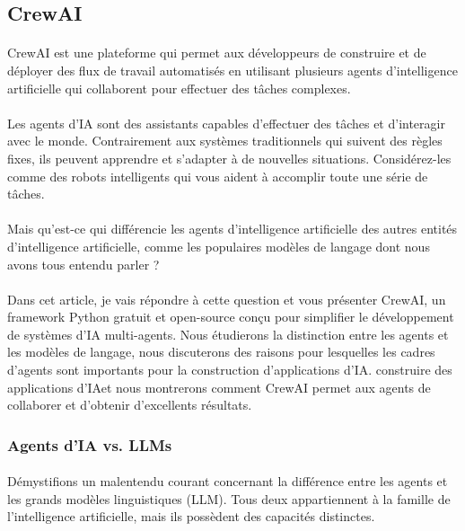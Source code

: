 \subsection{CrewAI }
\paragraph{}
CrewAI est une plateforme qui permet aux développeurs de construire et de déployer des flux de travail automatisés en utilisant plusieurs agents d'intelligence artificielle qui collaborent pour effectuer des tâches complexes.

\paragraph{}
Les agents d'IA sont des assistants capables d'effectuer des tâches et d'interagir avec le monde. Contrairement aux systèmes traditionnels qui suivent des règles fixes, ils peuvent apprendre et s'adapter à de nouvelles situations. Considérez-les comme des robots intelligents qui vous aident à accomplir toute une série de tâches.
\paragraph{}
Mais qu'est-ce qui différencie les agents d'intelligence artificielle des autres entités d'intelligence artificielle, comme les populaires modèles de langage dont nous avons tous entendu parler ?
\paragraph{}
Dans cet article, je vais répondre à cette question et vous présenter CrewAI, un framework Python gratuit et open-source conçu pour simplifier le développement de systèmes d'IA multi-agents. Nous étudierons la distinction entre les agents et les modèles de langage, nous discuterons des raisons pour lesquelles les cadres d'agents sont importants pour la construction d'applications d'IA. construire des applications d'IAet nous montrerons comment CrewAI permet aux agents de collaborer et d'obtenir d'excellents résultats.
\subsubsection{Agents d'IA vs. LLMs }
\paragraph{}
Démystifions un malentendu courant concernant la différence entre les agents et les grands modèles linguistiques (LLM). Tous deux appartiennent à la famille de l'intelligence artificielle, mais ils possèdent des capacités distinctes.

